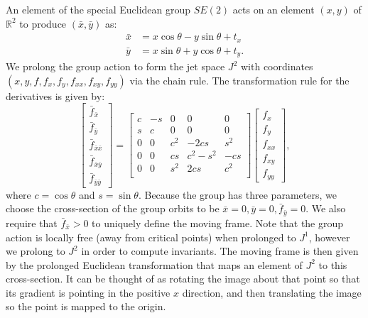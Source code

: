 \documentclass[review,onefignum,onetabnum]{siamonline190516}
\begin{document}
An element of the special Euclidean group $SE(2)$ acts on an element $(x, y)$ of $\mathbb{R}^2$ to produce $(\bar{x}, \bar{y})$ as:
\begin{equation*}
  \begin{aligned}
    \bar{x} &= x\cos\theta  - y\sin\theta + t_x \\
    \bar{y} &= x\sin\theta  + y\cos\theta + t_y.
  \end{aligned}
\end{equation*}
We prolong the group action to form the jet space $J^2$ with coordinates $(x,
y, f, f_x, f_y, f_{xx}, f_{xy}, f_{yy})$ via the chain rule. The
transformation rule for the derivatives is given by:
\begin{equation}
  \begin{bmatrix}
  \bar f_{\bar x} \\ \bar f_{\bar y} \\ \bar f_{\bar{x}\bar{x}} \\ \bar f_{\bar{x}\bar{y}} \\ \bar f_{\bar{y}\bar{y}}
  \end{bmatrix} = 
  \begin{bmatrix}
 c & -s & 0 & 0 & 0 \\
 s & c & 0 & 0 & 0 \\
0 & 0 & c^2 & -2cs & s^2 \\
0 & 0 & cs & c^2 - s^2 & -cs \\
0 & 0 & s^2 & 2cs & c^2 \\
  \end{bmatrix}
  \begin{bmatrix}
f_x \\ f_y \\ f_{xx} \\ f_{xy} \\ f_{yy} 
  \end{bmatrix},
\label{eqn:SE2}
 \end{equation}
where $c = \cos \theta$ and $s = \sin \theta$. Because the group has three
parameters, we choose the cross-section of the group orbits to be $\bar{x}
= 0, \bar{y} = 0, \bar{f}_{\bar{y}} = 0$. We also require that $\bar{f}_{\bar{x}}
> 0$ to uniquely define the moving frame. Note that the group action is
locally free (away from critical points) when prolonged to $J^1$, however
we prolong to $J^2$ in order to compute invariants. The moving
frame is then given by the prolonged Euclidean transformation that maps an
element of  $J^2$ to this cross-section. It can be thought of as rotating
the image about that point so that its gradient is pointing in the positive
$x$ direction, and then translating the image so the point is mapped to the
origin. 
\end{document}
